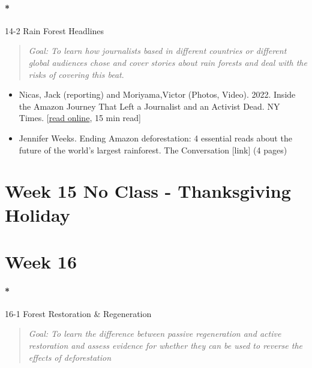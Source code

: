 \documentclass[
  10pt,
  letterpaper,
  oneside,
  open=any]{scrbook}
\let\oldparagraph\paragraph
\renewcommand{\paragraph}[1]{\oldparagraph{#1}\mbox{}}
\begin{document}
\paragraph*{14-2 Rain Forest Headlines}\label{rain-forest-headlines}

\begin{quote}
\emph{Goal: To learn how journalists based in different countries or
different global audiences chose and cover stories about rain forests
and deal with the risks of covering this beat}.
\end{quote}

\begin{itemize}
\item
  Nicas, Jack (reporting) and Moriyama,Victor (Photos, Video). 2022.
  Inside the Amazon Journey That Left a Journalist and an Activist Dead.
  NY Times.
  {[}\href{https://www.nytimes.com/interactive/2022/07/11/world/americas/amazon-murder-dom-phillips-bruno-pereira.html?smid=tw-nytimes&smtyp=cur}{read
  online}, 15 min read{]}
\item
  Jennifer Weeks. Ending Amazon deforestation: 4 essential reads about
  the future of the world's largest rainforest. The Conversation
  {[}link{]} (4 pages)
\end{itemize}

\section*{Week 15 No Class - Thanksgiving
Holiday}\label{week-15-no-class---thanksgiving-holiday}


\section*{Week 16}\label{week-16}


\paragraph*{16-1 Forest Restoration \&
Regeneration}\label{forest-restoration-regeneration}

\begin{quote}
\emph{Goal: To learn the difference between passive regeneration and
active restoration and assess evidence for whether they can be used to
reverse the effects of deforestation}
\end{quote}
\end{document}
